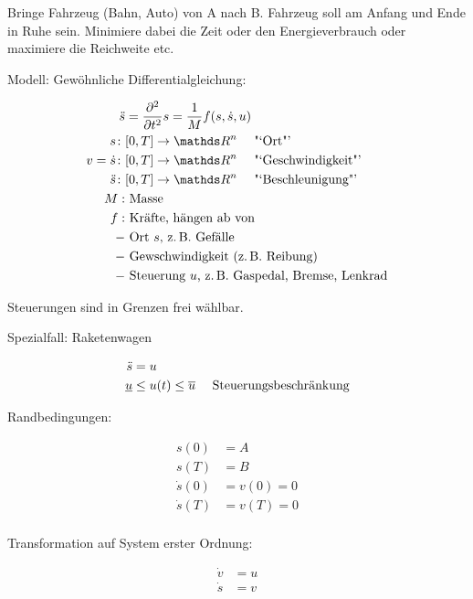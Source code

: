 



Bringe Fahrzeug (Bahn, Auto) von A nach B. Fahrzeug soll am Anfang und Ende in Ruhe sein. Minimiere dabei die Zeit oder den Energieverbrauch oder maximiere die Reichweite etc.

Modell: Gewöhnliche Differentialgleichung:

\begin{align*}
\ddot s &= \frac{\partial^2}{\partial t^2} s = \frac 1M f(s,\dot s, u) \\
s \colon & [0,T] \to \R^n \quad \text{ "`Ort"'} \\
v = \dot s \colon &[0,T] \to \R^n \quad \text{ "`Geschwindigkeit"'} \\
\ddot s \colon &[0,T] \to \R^n \quad \text{ "`Beschleunigung"'} \\
M: & \text{ Masse} \\
f: & \text{ Kräfte, hängen ab von }\\
- & \text{ Ort $s$, z.\,B. Gefälle} \\
- & \text{ Gewschwindigkeit (z.\,B. Reibung)} \\ 
- & \text{ Steuerung $u$, z.\,B. Gaspedal, Bremse, Lenkrad} \\
\end{align*}

Steuerungen sind in Grenzen frei wählbar.

Spezialfall: Raketenwagen

\begin{align*}
\ddot s &= u \\
\underline u & \leq u(t) \leq \overline u \quad \text{ Steuerungsbeschränkung} \\
\end{align*}

Randbedingungen:

\begin{align*}
s(0) &= A \\
s(T) &= B \\
\dot s(0) &= v(0) = 0 \\
\dot s(T) &= v(T) = 0 \\
\end{align*}

Transformation auf System erster Ordnung:

\begin{align*}
\dot v &= u \\
\dot s &= v
\end{align*}

